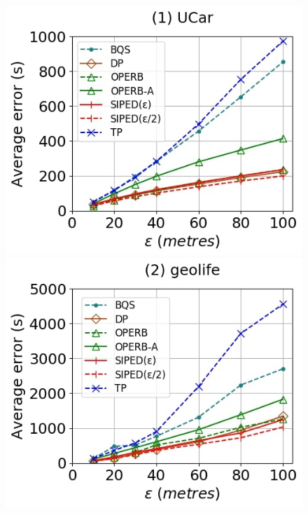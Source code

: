{\begin{figure}[tb!]
	\centering
	\includegraphics[scale = 0.250]{Figures/Exp-when-PED-error-epsilon-service.jpg}\hspace{0.5ex}
	\includegraphics[scale = 0.250]{Figures/Exp-when-PED-error-epsilon-geolife.jpg}\hspace{0.5ex}

\end{figure}}
